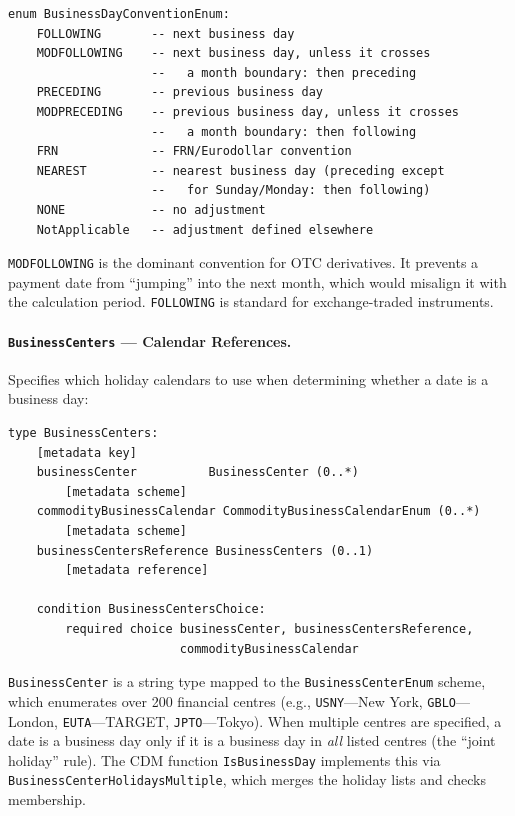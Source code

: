 \documentclass[11pt,a4paper]{article}
\begin{document}
\begin{lstlisting}
enum BusinessDayConventionEnum:
    FOLLOWING       -- next business day
    MODFOLLOWING    -- next business day, unless it crosses
                    --   a month boundary: then preceding
    PRECEDING       -- previous business day
    MODPRECEDING    -- previous business day, unless it crosses
                    --   a month boundary: then following
    FRN             -- FRN/Eurodollar convention
    NEAREST         -- nearest business day (preceding except
                    --   for Sunday/Monday: then following)
    NONE            -- no adjustment
    NotApplicable   -- adjustment defined elsewhere
\end{lstlisting}

\noindent \texttt{MODFOLLOWING} is the dominant convention for OTC derivatives. It prevents a payment date from ``jumping'' into the next month, which would misalign it with the calculation period. \texttt{FOLLOWING} is standard for exchange-traded instruments.

\paragraph{\texttt{BusinessCenters} --- Calendar References.} Specifies which holiday calendars to use when determining whether a date is a business day:

\begin{lstlisting}
type BusinessCenters:
    [metadata key]
    businessCenter          BusinessCenter (0..*)
        [metadata scheme]
    commodityBusinessCalendar CommodityBusinessCalendarEnum (0..*)
        [metadata scheme]
    businessCentersReference BusinessCenters (0..1)
        [metadata reference]

    condition BusinessCentersChoice:
        required choice businessCenter, businessCentersReference,
                        commodityBusinessCalendar
\end{lstlisting}

\noindent \texttt{BusinessCenter} is a string type mapped to the \texttt{BusinessCenterEnum} scheme, which enumerates over 200 financial centres (e.g., \texttt{USNY}---New York, \texttt{GBLO}---London, \texttt{EUTA}---TARGET, \texttt{JPTO}---Tokyo). When multiple centres are specified, a date is a business day only if it is a business day in \emph{all} listed centres (the ``joint holiday'' rule). The CDM function \texttt{IsBusinessDay} implements this via \texttt{BusinessCenterHolidaysMultiple}, which merges the holiday lists and checks membership.
\end{document}
